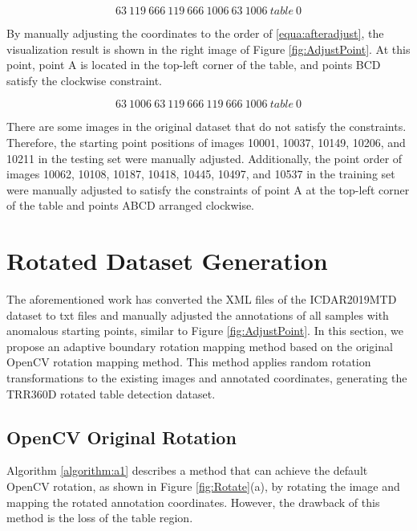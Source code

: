 \documentclass{article}
\begin{document}
\begin{equation}
	63 \ 119 \ 666 \ 119 \ 666 \ 1006 \ 63 \ 1006 \ table \ 0
 \label{equa:beforeadjust}
\end{equation}

By manually adjusting the coordinates to the order of \ref{equa:afteradjust}, the visualization result is shown in the right image of Figure \ref{fig:AdjustPoint}. At this point, point A is located in the top-left corner of the table, and points BCD satisfy the clockwise constraint.


\begin{equation}
	63 \ 1006 \ 63 \ 119 \ 666 \ 119 \ 666 \ 1006 \ table \ 0
 \label{equa:afteradjust}
\end{equation}

There are some images in the original dataset that do not satisfy the constraints. Therefore, the starting point positions of images 10001, 10037, 10149, 10206, and 10211 in the testing set were manually adjusted. Additionally, the point order of images 10062, 10108, 10187, 10418, 10445, 10497, and 10537 in the training set were manually adjusted to satisfy the constraints of point A at the top-left corner of the table and points ABCD arranged clockwise.



\section{Rotated Dataset Generation}




The aforementioned work has converted the XML files of the ICDAR2019MTD dataset to txt files and manually adjusted the annotations of all samples with anomalous starting points, similar to Figure \ref{fig:AdjustPoint}. In this section, we propose an adaptive boundary rotation mapping method based on the original OpenCV rotation mapping method. This method applies random rotation transformations to the existing images and annotated coordinates, generating the TRR360D rotated table detection dataset.

\subsection{OpenCV Original Rotation}

Algorithm \ref{algorithm:a1} describes a method that can achieve the default OpenCV rotation, as shown in  Figure \ref{fig:Rotate}(a), by rotating the image and mapping the rotated annotation coordinates. However, the drawback of this method is the loss of the table region.
\end{document}
